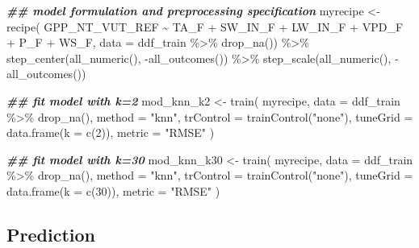\documentclass[
]{book}
\newenvironment{Shaded}{\begin{snugshade}}{\end{snugshade}}
\newcommand{\AttributeTok}[1]{\textcolor[rgb]{0.77,0.63,0.00}{#1}}
\newcommand{\DecValTok}[1]{\textcolor[rgb]{0.00,0.00,0.81}{#1}}
\newcommand{\DocumentationTok}[1]{\textcolor[rgb]{0.56,0.35,0.01}{\textbf{\textit{#1}}}}
\newcommand{\FunctionTok}[1]{\textcolor[rgb]{0.00,0.00,0.00}{#1}}
\newcommand{\NormalTok}[1]{#1}
\newcommand{\OtherTok}[1]{\textcolor[rgb]{0.56,0.35,0.01}{#1}}
\newcommand{\SpecialCharTok}[1]{\textcolor[rgb]{0.00,0.00,0.00}{#1}}
\newcommand{\StringTok}[1]{\textcolor[rgb]{0.31,0.60,0.02}{#1}}
\begin{document}
\begin{Shaded}
\begin{Highlighting}[]
\DocumentationTok{\#\# model formulation and preprocessing specification}
\NormalTok{myrecipe }\OtherTok{\textless{}{-}} \FunctionTok{recipe}\NormalTok{(}
\NormalTok{  GPP\_NT\_VUT\_REF }\SpecialCharTok{\textasciitilde{}}\NormalTok{ TA\_F }\SpecialCharTok{+}\NormalTok{ SW\_IN\_F }\SpecialCharTok{+}\NormalTok{ LW\_IN\_F }\SpecialCharTok{+}\NormalTok{ VPD\_F }\SpecialCharTok{+}\NormalTok{ P\_F }\SpecialCharTok{+}\NormalTok{ WS\_F, }
  \AttributeTok{data =}\NormalTok{ ddf\_train }\SpecialCharTok{\%\textgreater{}\%} \FunctionTok{drop\_na}\NormalTok{()) }\SpecialCharTok{\%\textgreater{}\%} 
  \FunctionTok{step\_center}\NormalTok{(}\FunctionTok{all\_numeric}\NormalTok{(), }\SpecialCharTok{{-}}\FunctionTok{all\_outcomes}\NormalTok{()) }\SpecialCharTok{\%\textgreater{}\%}
  \FunctionTok{step\_scale}\NormalTok{(}\FunctionTok{all\_numeric}\NormalTok{(), }\SpecialCharTok{{-}}\FunctionTok{all\_outcomes}\NormalTok{())}

\DocumentationTok{\#\# fit model with k=2}
\NormalTok{mod\_knn\_k2 }\OtherTok{\textless{}{-}} \FunctionTok{train}\NormalTok{(}
\NormalTok{  myrecipe, }
  \AttributeTok{data =}\NormalTok{ ddf\_train }\SpecialCharTok{\%\textgreater{}\%} 
    \FunctionTok{drop\_na}\NormalTok{(), }
  \AttributeTok{method =} \StringTok{"knn"}\NormalTok{,}
  \AttributeTok{trControl =} \FunctionTok{trainControl}\NormalTok{(}\StringTok{"none"}\NormalTok{),}
  \AttributeTok{tuneGrid =} \FunctionTok{data.frame}\NormalTok{(}\AttributeTok{k =} \FunctionTok{c}\NormalTok{(}\DecValTok{2}\NormalTok{)),}
  \AttributeTok{metric =} \StringTok{"RMSE"}
\NormalTok{  )}

\DocumentationTok{\#\# fit model with k=30}
\NormalTok{mod\_knn\_k30 }\OtherTok{\textless{}{-}} \FunctionTok{train}\NormalTok{(}
\NormalTok{  myrecipe, }
  \AttributeTok{data =}\NormalTok{ ddf\_train }\SpecialCharTok{\%\textgreater{}\%} 
    \FunctionTok{drop\_na}\NormalTok{(), }
  \AttributeTok{method =} \StringTok{"knn"}\NormalTok{,}
  \AttributeTok{trControl =} \FunctionTok{trainControl}\NormalTok{(}\StringTok{"none"}\NormalTok{),}
  \AttributeTok{tuneGrid =} \FunctionTok{data.frame}\NormalTok{(}\AttributeTok{k =} \FunctionTok{c}\NormalTok{(}\DecValTok{30}\NormalTok{)),}
  \AttributeTok{metric =} \StringTok{"RMSE"}
\NormalTok{  )}
\end{Highlighting}
\end{Shaded}

\hypertarget{prediction-1}{%
\subsection{Prediction}\label{prediction-1}}
\end{document}
